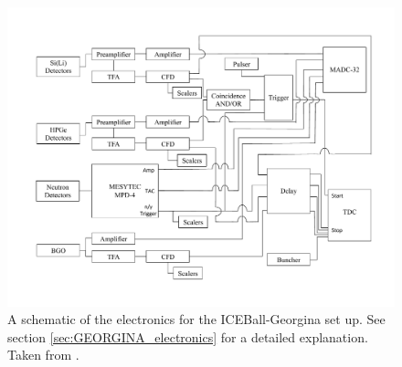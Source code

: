 \begin{figure}[hbt!]
    \centering
    \includegraphics[scale=0.5]{Setup_Figs/electronics-diagram.pdf}
    \caption{A schematic of the electronics for the ICEBall-Georgina set up. See section \ref{sec:GEORGINA_electronics} for a detailed explanation. Taken from \citep{battaglia15:_iceball_176lu}.}
    \label{fig:iceball_electronics}
\end{figure}